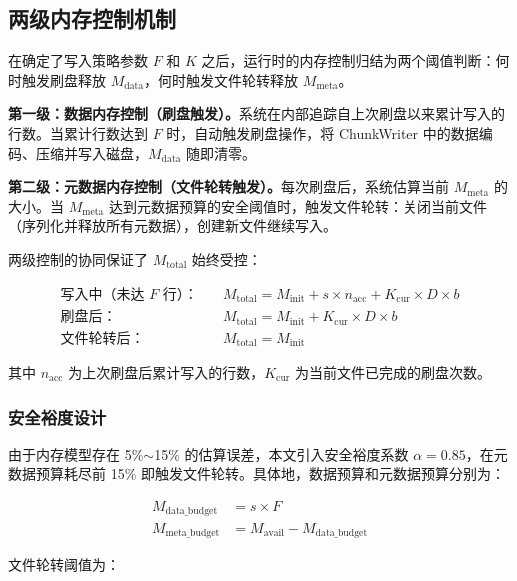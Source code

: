 \subsection{两级内存控制机制}

在确定了写入策略参数 $F$ 和 $K$ 之后，运行时的内存控制归结为两个阈值判断：何时触发刷盘释放 $M_{\text{data}}$，何时触发文件轮转释放 $M_{\text{meta}}$。

\textbf{第一级：数据内存控制（刷盘触发）。}系统在内部追踪自上次刷盘以来累计写入的行数。当累计行数达到 $F$ 时，自动触发刷盘操作，将 ChunkWriter 中的数据编码、压缩并写入磁盘，$M_{\text{data}}$ 随即清零。

\textbf{第二级：元数据内存控制（文件轮转触发）。}每次刷盘后，系统估算当前 $M_{\text{meta}}$ 的大小。当 $M_{\text{meta}}$ 达到元数据预算的安全阈值时，触发文件轮转：关闭当前文件（序列化并释放所有元数据），创建新文件继续写入。

两级控制的协同保证了 $M_{\text{total}}$ 始终受控：

\begin{align}
  \text{写入中（未达~} F \text{~行）：} \quad & M_{\text{total}} = M_{\text{init}} + s \times n_{\text{acc}} + K_{\text{cur}} \times D \times b \label{eq:runtime-writing} \\
  \text{刷盘后：} \quad & M_{\text{total}} = M_{\text{init}} + K_{\text{cur}} \times D \times b \label{eq:runtime-flushed} \\
  \text{文件轮转后：} \quad & M_{\text{total}} = M_{\text{init}} \label{eq:runtime-rotated}
\end{align}

其中 $n_{\text{acc}}$ 为上次刷盘后累计写入的行数，$K_{\text{cur}}$ 为当前文件已完成的刷盘次数。

\subsubsection{安全裕度设计}

由于内存模型存在 5\%$\sim$15\% 的估算误差，本文引入安全裕度系数 $\alpha = 0.85$，在元数据预算耗尽前 15\% 即触发文件轮转。具体地，数据预算和元数据预算分别为：

\begin{align}
  M_{\text{data\_budget}} &= s \times F \label{eq:data-budget} \\
  M_{\text{meta\_budget}} &= M_{\text{avail}} - M_{\text{data\_budget}} \label{eq:meta-budget}
\end{align}

文件轮转阈值为：

